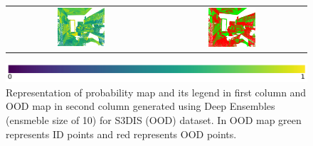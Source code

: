 \begin{figure}[h!]
\begin{tabular}{cc}
            \includegraphics[width=0.33\textwidth, height=0.18\textheight]{images/ood_imgs/de_s3dis/ofc_42_de_prob.pdf}& 
            \includegraphics[width=0.33\textwidth, height=0.18\textheight]{images/ood_imgs/de_s3dis/de_prob_1.pdf}\\
        \end{tabular}
        \includegraphics[scale=0.45]{images/prob_legend.pdf}
        \caption{Representation of probability map and its legend in first column and OOD map in second column generated using Deep Ensembles (ensmeble size of 10) for S3DIS (OOD) dataset. In OOD map green represents ID points and red represents OOD points.}
        \label{fig:de_s3dis_oodmap_prob}
    \end{figure}
